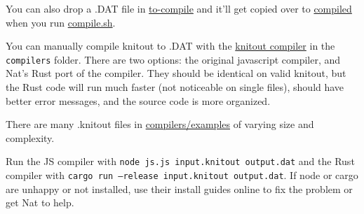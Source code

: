\documentclass[acmsmall,screen,review,anonymous,nonacm]{acmart}
\begin{document}
You can also drop a .DAT file in \href{../to-compile}{to-compile} and it'll get copied
over to \href{../compiled}{compiled} when you run \href{../compile.sh}{compile.sh}.

You can manually compile knitout to .DAT with the \href{../compilers/js.js}{knitout compiler}
in the \texttt{compilers} folder. There are two options: the original javascript compiler, and Nat's Rust port of the
compiler. They should be identical on valid knitout, but the Rust code will run much faster (not noticeable on single
files), should have better error messages, and the source code is more organized.

There are many .knitout files in \href{../compilers/examples}{compilers/examples} of varying size and complexity.

Run the JS compiler with \texttt{node js.js input.knitout output.dat} and the Rust compiler with \texttt{cargo run --release input.knitout output.dat}.
If node or cargo are unhappy or not installed, use their install guides online to fix the problem or get Nat to help.
\end{document}
